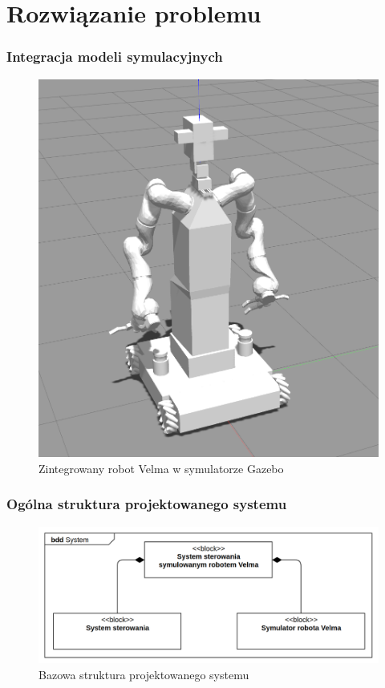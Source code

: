 \section{Rozwiązanie problemu} 

\begin{frame}
    \frametitle{Integracja modeli symulacyjnych}
    \begin{figure}
        \includegraphics[scale=0.20]{./images/omnivelmobil-final-cropped.png}
        \caption{Zintegrowany robot Velma w symulatorze Gazebo}
    \end{figure}
\end{frame}

\begin{frame}
    \frametitle{Ogólna struktura projektowanego systemu} 
    \begin{figure}[b]
        \label{rosgraph_example}
        \centering
        \def\svgwidth{\columnwidth}
        \vspace{0.1cm}
        \includegraphics[scale=0.25]{images/basic_system.png}
        \vspace{0.1cm}
        \caption{Bazowa struktura projektowanego systemu}
    \end{figure}
\end{frame}

